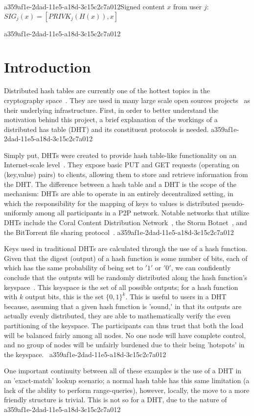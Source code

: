 \documentclass[12pt]{article}
\begin{document}
a359af1e-2dad-11e5-a18d-3c15c2c7a012Signed content $x$ from user $j$: $SIG_j(x) = \left[ PRIVK_j( H(x) ), x \right]$

a359af1e-2dad-11e5-a18d-3c15c2c7a012\section{Introduction}
\par Distributed hash tables are currently one of the hottest topics in the cryptography space~\cite{Stoica:2001dj,Rowstron:2001ea,Ratnasamy:2001wn}. They are used in many large scale open sources projects~\cite{Freitas:2013tb,Xu:2010vs,Perfitt:2010fh} as their underlying infrastructure. First, in order to better understand the motivation behind this project, a brief explanation of the workings of a distributed has table (DHT) and its constituent protocols is needed.
a359af1e-2dad-11e5-a18d-3c15c2c7a012
\par Simply put, DHTs were created to provide hash table-like functionality on an Internet-scale level~\cite{Ratnasamy:2001wn}. They expose basic PUT and GET requests (operating on (key,value) pairs) to clients, allowing them to store and retrieve information from the DHT. The difference between a hash table and a DHT is the scope of the mechanism: DHTs are able to operate in an entirely decentralized setting, in which the responsibility for the mapping of keys to values is distributed pseudo-uniformly among all participants in a P2P network. Notable networks that utilize DHTs include the Coral Content Distribution Network~\cite{Freedman:2004vb}, the Storm Botnet~\cite{Holz:2008uk}, and the BitTorrent file sharing protocol~\cite{Cohen:y1_8mBnw}.
a359af1e-2dad-11e5-a18d-3c15c2c7a012
\par Keys used in traditional DHTs are calculated through the use of a hash function. Given that the digest (output) of a hash function is some number of bits, each of which has the same probability of being set to $'1'$ or $'0'$, we can confidently conclude that the outputs will be randomly distributed along the hash function's keyspace~. This keyspace is the set of all possible outputs; for a hash function with $k$ output bits, this is the set $\{0,1\}^k$. This is useful to users in a DHT because, assuming that a given hash function is 'sound,' in that its outputs are actually evenly distributed, they are able to mathematically verify the even partitioning of the keyspace. The participants can thus trust that both the load will be balanced fairly among all nodes. No one node will have complete control, and no group of nodes will be unfairly burdened due to their being 'hotspots' in the keyspace.~
a359af1e-2dad-11e5-a18d-3c15c2c7a012
\par One important continuity between all of these examples is the use of a DHT in an 'exact-match' lookup scenario; a normal hash table has this same limitation (a lack of the ability to perform range-queries), however, locally, the move to a more friendly structure is trivial. This is not so for a DHT, due to the nature of
a359af1e-2dad-11e5-a18d-3c15c2c7a012\printbibliography
\end{document}
